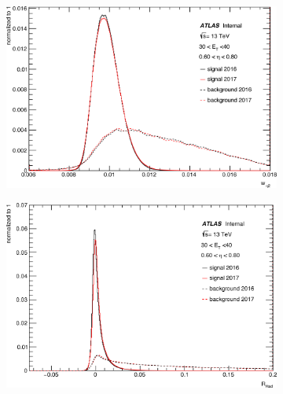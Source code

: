 \begin{figure}[p]
\begin{subfigure}[b]{0.49\textwidth}
    \label{fig:egamma:trig_deltaPhi_res}
  \end{subfigure}
  \hfill
  \begin{subfigure}[b]{0.49\textwidth}
    \centering
    \includegraphics[width=1.0\textwidth]{figs/egamma/trig_weta2_highet.png} 
    \label{fig:egamma:trig_weta2}
  \end{subfigure}
  \begin{subfigure}[b]{0.49\textwidth}
      \centering
    \includegraphics[width=1.0\textwidth]{figs/egamma/trig_rhad_highet.png} 
    \label{fig:egamma:trig_rhad}
  \end{subfigure}
  \hfill
  \begin{subfigure}[b]{0.49\textwidth}
    \centering

\end{subfigure}
\end{figure}
